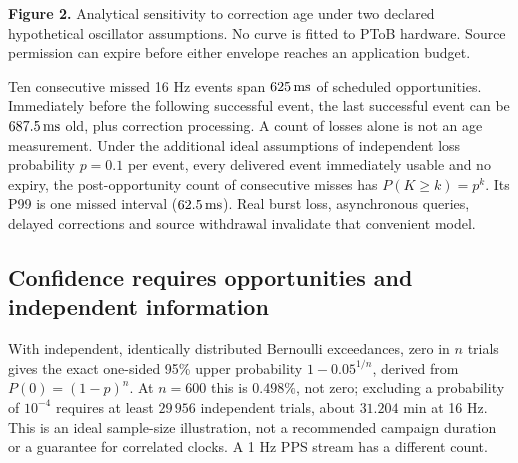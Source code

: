 \documentclass[11pt,letterpaper]{article}
\begin{document}
\begin{center}
\end{center}\vspace{-8pt}
{\small\textbf{Figure 2.} Analytical sensitivity to correction age under two declared hypothetical oscillator assumptions. No curve is fitted to PToB hardware. Source permission can expire before either envelope reaches an application budget.}

Ten consecutive missed 16 Hz events span $625\,\mathrm{ms}$ of scheduled opportunities. Immediately before the following successful event, the last successful event can be $687.5\,\mathrm{ms}$ old, plus correction processing. A count of losses alone is not an age measurement. Under the additional ideal assumptions of independent loss probability $p=0.1$ per event, every delivered event immediately usable and no expiry, the post-opportunity count of consecutive misses has $P(K\ge k)=p^k$. Its P99 is one missed interval ($62.5\,\mathrm{ms}$). Real burst loss, asynchronous queries, delayed corrections and source withdrawal invalidate that convenient model.

\subsection{Confidence requires opportunities and independent information}
With independent, identically distributed Bernoulli exceedances, zero in $n$ trials gives the exact one-sided 95\% upper probability $1-0.05^{1/n}$, derived from $P(0)=(1-p)^n$. At $n=600$ this is $0.498\%$, not zero; excluding a probability of $10^{-4}$ requires at least $29\,956$ independent trials, about $31.204$ min at 16 Hz. This is an ideal sample-size illustration, not a recommended campaign duration or a guarantee for correlated clocks. A 1 Hz PPS stream has a different count.
\end{document}
